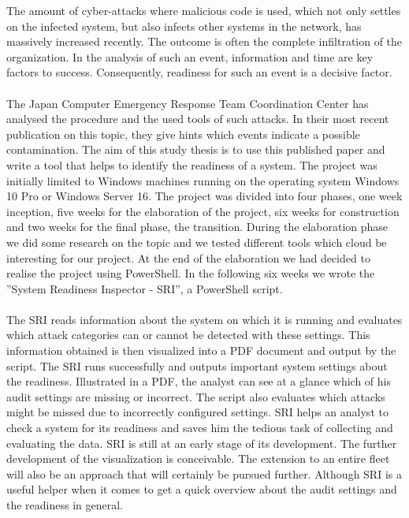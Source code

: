 \thispagestyle{plain}
\renewcommand\section{\stdsection}
\vspace{-0.25cm}
\thispagestyle{plain}
The amount of cyber-attacks where malicious code is used, which not only settles on the infected system, but also infects other systems in the network, has massively increased recently. The outcome is often the complete infiltration of the organization. In the analysis of such an event, information and time are key factors to success. Consequently, readiness for such an event is a decisive factor. \\\\
The Japan Computer Emergency Response Team Coordination Center has analysed the procedure and the used tools of such attacks. In their most recent publication on this topic, they give hints which events indicate a possible contamination. The aim of this study thesis is to use this published paper and write a tool that helps to identify the readiness of a system.
\vspace{-0.25cm}
\thispagestyle{plain}
The project was initially limited to Windows machines running on the operating system Windows 10 Pro or Windows Server 16. The project was divided into four phases, one week inception, five weeks for the elaboration of the project, six weeks for construction and two weeks for the final phase, the transition. During the elaboration phase we did some research on the topic and we tested different tools which cloud be interesting for our project. At the end of the elaboration we had decided to realise the project using PowerShell. In the following six weeks we wrote the ''System Readiness Inspector - SRI'', a PowerShell script. \\\\
The SRI reads information about the system on which it is running and evaluates which attack categories can or cannot be detected with these settings. This information obtained is then visualized into a PDF document and output by the script.
\vspace{-0.25cm}
\thispagestyle{plain}
The SRI runs successfully and outputs important system settings about the readiness. Illustrated in a PDF, the analyst can see at a glance which of his audit settings are missing or incorrect. The script also evaluates which attacks might be missed due to incorrectly configured settings. SRI helps an analyst to check a system for its readiness and saves him the tedious task of collecting and evaluating the data.
\vspace{-0.25cm}
\thispagestyle{plain}
SRI is still at an early stage of its development. The further development of the visualization is conceivable. The extension to an entire fleet will also be an approach that will certainly be pursued further. Although SRI is a useful helper when it comes to get a quick overview about the audit settings and the readiness in general.



\renewcommand\section{\clearpage\stdsection}